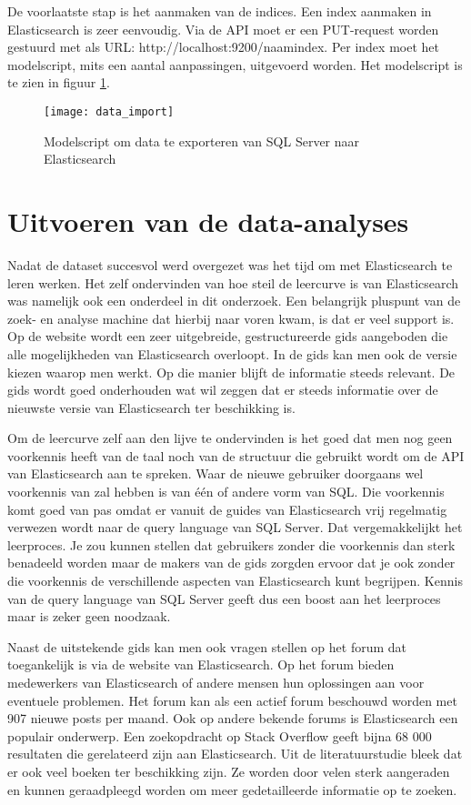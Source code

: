 De voorlaatste stap is het aanmaken van de indices. Een index aanmaken in Elasticsearch is zeer eenvoudig. Via de API moet er een PUT-request worden gestuurd met als URL: http://localhost:9200/naam\textunderscore index.
Per index moet het modelscript, mits een aantal aanpassingen, uitgevoerd worden. Het modelscript is te zien in figuur \ref{fig:data_import}.

\begin{figure}
	\centering
	\texttt{[image: data\_import]}
	\caption{Modelscript om data te exporteren van SQL Server naar Elasticsearch}
	\label{fig:data_import}
\end{figure}

\section{Uitvoeren van de data-analyses}
Nadat de dataset succesvol werd overgezet was het tijd om met Elasticsearch te leren werken. Het zelf ondervinden van hoe steil de leercurve is van Elasticsearch was namelijk ook een onderdeel in dit onderzoek. Een belangrijk pluspunt van de zoek- en analyse machine dat hierbij naar voren kwam, is dat er veel support is. Op de website wordt een zeer uitgebreide, gestructureerde gids aangeboden die alle mogelijkheden van Elasticsearch overloopt. In de gids kan men ook de versie kiezen waarop men werkt. Op die manier blijft de informatie steeds relevant. De gids wordt goed onderhouden wat wil zeggen dat er steeds informatie over de nieuwste versie van Elasticsearch ter beschikking is. 

Om de leercurve zelf aan den lijve te ondervinden is het goed dat men nog geen voorkennis heeft van de taal noch van de structuur die gebruikt wordt om de API van Elasticsearch aan te spreken. Waar de nieuwe gebruiker doorgaans wel voorkennis van zal hebben is van één of andere vorm van SQL. Die voorkennis komt goed van pas omdat er vanuit de guides van Elasticsearch vrij regelmatig verwezen wordt naar de query language van SQL Server. Dat vergemakkelijkt het leerproces. Je zou kunnen stellen dat gebruikers zonder die voorkennis dan sterk benadeeld worden maar de makers van de gids zorgden ervoor dat je ook zonder die voorkennis de verschillende aspecten van Elasticsearch kunt begrijpen. Kennis van de query language van SQL Server geeft dus een boost aan het leerproces maar is zeker geen noodzaak.

Naast de uitstekende gids kan men ook vragen stellen op het forum dat toegankelijk is via de website van Elasticsearch. Op het forum bieden medewerkers van Elasticsearch of andere mensen hun oplossingen aan voor eventuele problemen. Het forum kan als een actief forum beschouwd worden met 907 nieuwe posts per maand. Ook op andere bekende forums is Elasticsearch een populair onderwerp. Een zoekopdracht op Stack Overflow geeft bijna 68 000 resultaten die gerelateerd zijn aan Elasticsearch. Uit de literatuurstudie bleek dat er ook veel boeken ter beschikking zijn. Ze worden door velen sterk aangeraden en kunnen geraadpleegd worden om meer gedetailleerde informatie op te zoeken. 

